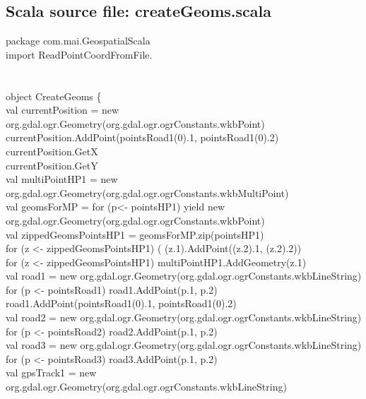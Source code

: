 \documentclass {article}
\begin{document}
\begin{appendices}
\section {Scala source file: createGeoms.scala}
package com.mai.GeospatialScala\\
import ReadPointCoordFromFile.\underline{\space}\\
\\
\\
object CreateGeoms \{ \\
val currentPosition = new org.gdal.ogr.Geometry(org.gdal.ogr.ogrConstants.wkbPoint)\\
currentPosition.AddPoint(pointsRoad1(0).\underline{\space}1, pointsRoad1(0).\underline{\space}2)\\
currentPosition.GetX\\
currentPosition.GetY\\
val multiPointHP1 = new org.gdal.ogr.Geometry(org.gdal.ogr.ogrConstants.wkbMultiPoint)\\
val geomsForMP = for (p<- pointsHP1) yield new org.gdal.ogr.Geometry(org.gdal.ogr.ogrConstants.wkbPoint)\\
val zippedGeomsPointsHP1 = geomsForMP.zip(pointsHP1)\\
for (z <- zippedGeomsPointsHP1)  ( (z.\underline{\space}1).AddPoint((z.\underline{\space}2).\underline{\space}1, (z.\underline{\space}2).\underline{\space}2))\\
for (z <- zippedGeomsPointsHP1) multiPointHP1.AddGeometry(z.\underline{\space}1)\\
val road1 = new org.gdal.ogr.Geometry(org.gdal.ogr.ogrConstants.wkbLineString)\\
for (p <- pointsRoad1) road1.AddPoint(p.\underline{\space}1, p.\underline{\space}2)\\
road1.AddPoint(pointsRoad1(0).\underline{\space}1, pointsRoad1(0).\underline{\space}2)\\
val road2 = new org.gdal.ogr.Geometry(org.gdal.ogr.ogrConstants.wkbLineString)\\
for (p <- pointsRoad2) road2.AddPoint(p.\underline{\space}1, p.\underline{\space}2)\\
val road3 = new org.gdal.ogr.Geometry(org.gdal.ogr.ogrConstants.wkbLineString)\\
for (p <- pointsRoad3) road3.AddPoint(p.\underline{\space}1, p.\underline{\space}2)\\
val gpsTrack1 = new org.gdal.ogr.Geometry(org.gdal.ogr.ogrConstants.wkbLineString)\\

\end{appendices}
\end{document}

